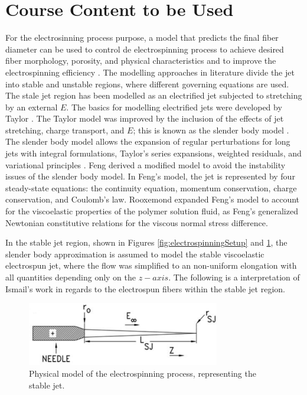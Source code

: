 \section{Course Content to be Used}
For the electrosinning process purpose, a model that predicts the final fiber diameter can be used to control de electrospinning process to achieve desired fiber morphology, porosity, and physical characteristics and to improve the electrospinning efficiency \cite{Rafiei2013}. The modelling approaches in literature \cite{Feng2002, Gupta2004, Helgeson2008, Hohman2001, Reneker2006, Roozemond2007, Taylor1969, Yarin2011} divide the jet into stable and unstable regions, where different governing equations are used. The stale jet region has been modelled as an electrified jet subjected to stretching by an external $E$. The basics for modelling electrified jets were developed by Taylor \cite{Taylor1969}. The Taylor model was improved by the inclusion of the effects of jet stretching, charge transport, and $E$; this is known as the slender body model \cite{Gupta2004}. The slender body model allows the expansion of regular perturbations for long jets with integral formulations, Taylor's series expansions, weighted residuals, and variational principles \cite{Feng2002}. Feng \cite{Feng2002} derived a modified model to avoid the instability issues of the slender body model. In Feng's model, the jet is represented by four steady-state equations: the continuity equation, momentum conservation, charge conservation, and Coulomb's law. Rooxemond expanded Feng's model to account for the viscoelastic properties of the polymer solution fluid, as Feng's generalized Newtonian constitutive relations for the viscous normal stress difference.

In the stable jet region, shown in Figures \ref{fig:electrospinningSetup} and \ref{fig:electrospinningStableRegion}, the slender body approximation is assumed to model the stable viscoelastic electrospun jet, where the flow was simplified to an non-uniform elongation with all quantities depending only on the $z-axis$. The following is a interpretation of Ismail's work \cite{Ismail2016} in regards to the electrospun fibers within the stable jet region.

\begin{figure}[th]
\centering
\includegraphics[width=0.75\textwidth]{./Figures/electrospinningStableRegion.png}
\decoRule
\caption[Electrospinning Stable Region]{Physical model of the electrospinning process, representing the stable jet. \cite{Ismail2016}}
\label{fig:electrospinningStableRegion}
\end{figure}

